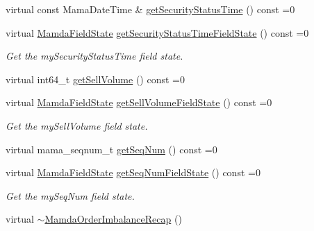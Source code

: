 \begin{CompactItemize}
virtual const Mama\-Date\-Time \& \hyperlink{classWombat_1_1MamdaOrderImbalanceRecap_f8a6454c6f2df2cec6d1bf0947cb4863}{get\-Security\-Status\-Time} () const =0
\item 
virtual \hyperlink{namespaceWombat_93aac974f2ab713554fd12a1fa3b7d2a}{Mamda\-Field\-State} \hyperlink{classWombat_1_1MamdaOrderImbalanceRecap_57f208148935324b7c942a10f8591433}{get\-Security\-Status\-Time\-Field\-State} () const =0
\begin{CompactList}\small\item\em Get the my\-Security\-Status\-Time field state. \item\end{CompactList}\item 
virtual int64\_\-t \hyperlink{classWombat_1_1MamdaOrderImbalanceRecap_cb0e8ad41a7b39232e2ccb88a661d566}{get\-Sell\-Volume} () const =0
\item 
virtual \hyperlink{namespaceWombat_93aac974f2ab713554fd12a1fa3b7d2a}{Mamda\-Field\-State} \hyperlink{classWombat_1_1MamdaOrderImbalanceRecap_cc07b533268359fb2a968d83ffe618be}{get\-Sell\-Volume\-Field\-State} () const =0
\begin{CompactList}\small\item\em Get the my\-Sell\-Volume field state. \item\end{CompactList}\item 
virtual mama\_\-seqnum\_\-t \hyperlink{classWombat_1_1MamdaOrderImbalanceRecap_2602c30d3dfd6dc8dd9aceaa33c4de24}{get\-Seq\-Num} () const =0
\item 
virtual \hyperlink{namespaceWombat_93aac974f2ab713554fd12a1fa3b7d2a}{Mamda\-Field\-State} \hyperlink{classWombat_1_1MamdaOrderImbalanceRecap_5a26737b3bf2abcb981786581875357c}{get\-Seq\-Num\-Field\-State} () const =0
\begin{CompactList}\small\item\em Get the my\-Seq\-Num field state. \item\end{CompactList}\item 
virtual \hyperlink{classWombat_1_1MamdaOrderImbalanceRecap_9a42dd7d74c4989c4f0b0290649f026b}{$\sim$Mamda\-Order\-Imbalance\-Recap} ()
\end{CompactItemize}


